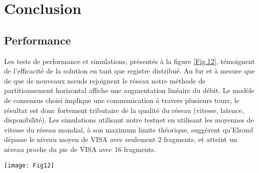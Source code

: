 \documentclass[journal]{IEEEtran}
\begin{document}

\section{Conclusion}
\subsection{Performance}

Les tests de performance et simulations, présentés à la figure \ref{Fig.12}, témoignent de l'efficacité de la solution en tant que registre distribué. Au fur et à mesure que de que de nouveaux nœuds rejoignent le réseau notre méthode de partitionnement horizontal affiche une augmentation linéaire du débit.
Le modèle de consensus choisi implique une communication à travers plusieurs tours, le résultat est donc fortement tributaire de la qualité du réseau (vitesse, latence, disponibilité). Les simulations utilisant notre testnet en utilisant les moyennes de vitesse du réseau mondial, à son maximum limite théorique, suggèrent qu'Elrond dépasse le niveau  moyen de VISA avec seulement 2 fragments, et atteint un niveau proche du pic de VISA avec 16 fragments.

\begin{figure*}[h]
         \centering
	\texttt{[image: Fig12]} %
	\caption{Débit du réseau mesuré en transactions par seconde avec une vitesse globale du réseau de 8 Mo/s} %
	\label{Fig.12} %
\end{figure*}
\end{document}

